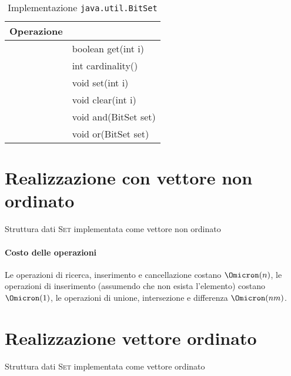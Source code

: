 \begin{table}[ht]
	\centering
	\caption{Implementazione \texttt{java.util.BitSet}}%
	\label{tab:java-set-implementation}
	\begin{tabular}{@{} l >{\ttfamily}l @{}}
	\toprule
		Operazione & \normalfont{Metodo} \\
	\midrule
		\setContains & boolean get(int i) \\
		\setSize & int cardinality() \\
		\setInsert & void set(int i) \\
		\setRemove & void clear(int i) \\
		\setUnion & void and(BitSet set) \\
		\setIntersection & void or(BitSet set) \\
	\bottomrule
	\end{tabular}
\end{table}

\vspace{-10pt}
\section{Realizzazione con vettore non ordinato}

\begin{algorithm}[H]
	\caption[Struttura dati insieme implementata come vettore non ordinato]
	        {Struttura dati \textsc{Set} implementata come vettore non ordinato}
	
\end{algorithm}

\paragraph{Costo delle operazioni}
Le operazioni di ricerca, inserimento e cancellazione costano \(\Omicron(n)\), le operazioni di inserimento (assumendo che non esista l'elemento) costano \(\Omicron(1)\), le operazioni di unione, intersezione e differenza \(\Omicron(nm)\).

\clearpage
\section{Realizzazione vettore ordinato}

\begin{algorithm}[H]
	\caption[Struttura dati insieme implementata come vettore ordinato]
	        {Struttura dati \textsc{Set} implementata come vettore ordinato}
	
\end{algorithm}

